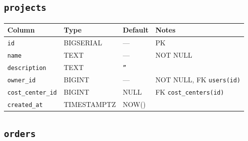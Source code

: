 \documentclass[12pt,a4paper,twoside]{report}
\newcommand{\code}[1]{\texttt{#1}}
\begin{document}
\subsection*{\texttt{projects}}

\begin{table}[H]
  \centering\small
  \begin{tabular}{@{}llll@{}}
    \toprule
    \textbf{Column} & \textbf{Type} & \textbf{Default} & \textbf{Notes} \\
    \midrule
    \code{id}             & BIGSERIAL   & ---   & PK \\
    \code{name}           & TEXT        & ---   & NOT NULL \\
    \code{description}    & TEXT        & \code{''} & \\
    \code{owner\_id}      & BIGINT      & ---   & NOT NULL, FK \textrightarrow{} \code{users(id)} \\
    \code{cost\_center\_id}& BIGINT     & NULL  & FK \textrightarrow{} \code{cost\_centers(id)} \\
    \code{created\_at}    & TIMESTAMPTZ & NOW() & \\
    \bottomrule
  \end{tabular}
\end{table}

\subsection*{\texttt{orders}}
\end{document}
